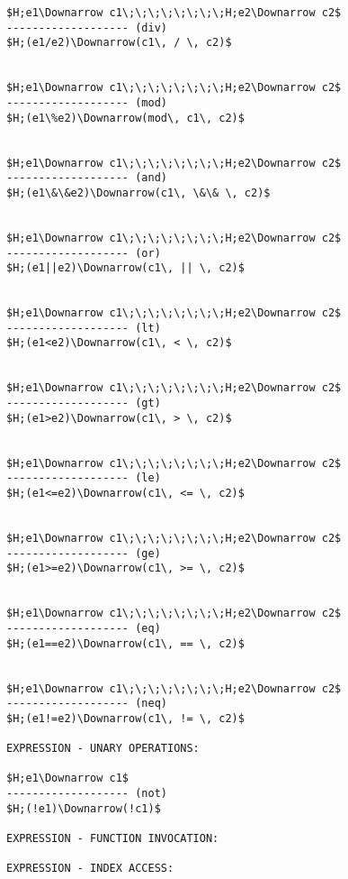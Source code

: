 \documentclass[11pt, a4paper]{article}
\begin{document}
\begin{lstlisting}
$H;e1\Downarrow c1\;\;\;\;\;\;\;\;H;e2\Downarrow c2$
------------------- (div)
$H;(e1/e2)\Downarrow(c1\, / \, c2)$


$H;e1\Downarrow c1\;\;\;\;\;\;\;\;H;e2\Downarrow c2$
------------------- (mod)
$H;(e1\%e2)\Downarrow(mod\, c1\, c2)$


$H;e1\Downarrow c1\;\;\;\;\;\;\;\;H;e2\Downarrow c2$
------------------- (and)
$H;(e1\&\&e2)\Downarrow(c1\, \&\& \, c2)$


$H;e1\Downarrow c1\;\;\;\;\;\;\;\;H;e2\Downarrow c2$
------------------- (or)
$H;(e1||e2)\Downarrow(c1\, || \, c2)$


$H;e1\Downarrow c1\;\;\;\;\;\;\;\;H;e2\Downarrow c2$
------------------- (lt)
$H;(e1<e2)\Downarrow(c1\, < \, c2)$


$H;e1\Downarrow c1\;\;\;\;\;\;\;\;H;e2\Downarrow c2$
------------------- (gt)
$H;(e1>e2)\Downarrow(c1\, > \, c2)$


$H;e1\Downarrow c1\;\;\;\;\;\;\;\;H;e2\Downarrow c2$
------------------- (le)
$H;(e1<=e2)\Downarrow(c1\, <= \, c2)$


$H;e1\Downarrow c1\;\;\;\;\;\;\;\;H;e2\Downarrow c2$
------------------- (ge)
$H;(e1>=e2)\Downarrow(c1\, >= \, c2)$


$H;e1\Downarrow c1\;\;\;\;\;\;\;\;H;e2\Downarrow c2$
------------------- (eq)
$H;(e1==e2)\Downarrow(c1\, == \, c2)$


$H;e1\Downarrow c1\;\;\;\;\;\;\;\;H;e2\Downarrow c2$
------------------- (neq)
$H;(e1!=e2)\Downarrow(c1\, != \, c2)$

EXPRESSION - UNARY OPERATIONS:

$H;e1\Downarrow c1$
------------------- (not)
$H;(!e1)\Downarrow(!c1)$

EXPRESSION - FUNCTION INVOCATION:

EXPRESSION - INDEX ACCESS:
\end{lstlisting}
\end{document}

